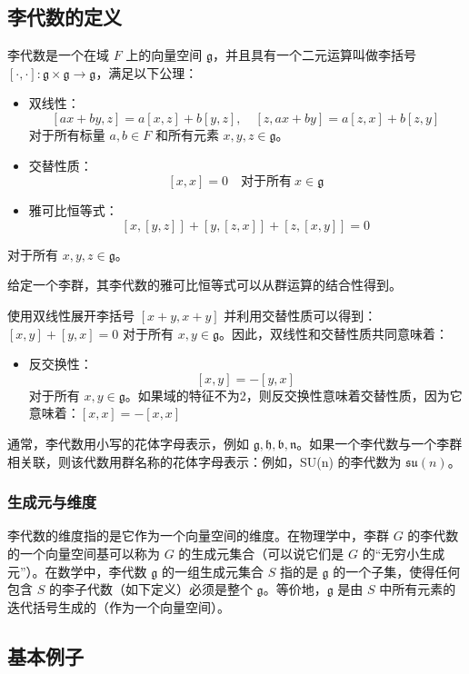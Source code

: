 \subsection{李代数的定义}  
李代数是一个在域 \( F \) 上的向量空间 \( \mathfrak{g} \)，并且具有一个二元运算叫做李括号 \( [\cdot, \cdot]: \mathfrak{g} \times \mathfrak{g} \to \mathfrak{g} \)，满足以下公理：

\begin{itemize}
\item 双线性：  
   \[
   [ax + by, z] = a[x, z] + b[y, z], \quad [z, ax + by] = a[z, x] + b[z, y]~
   \]
   对于所有标量 \( a, b \in F \) 和所有元素 \( x, y, z \in \mathfrak{g} \)。
\item 交替性质：
   \[
   [x, x] = 0 \quad \text{对于所有} \ x \in \mathfrak{g}~
   \]
\item 雅可比恒等式：
   \[
   [x, [y, z]] + [y, [z, x]] + [z, [x, y]] = 0~
   \]
\end{itemize}
   对于所有 \( x, y, z \in \mathfrak{g} \)。

   给定一个李群，其李代数的雅可比恒等式可以从群运算的结合性得到。

使用双线性展开李括号 \( [x + y, x + y] \) 并利用交替性质可以得到：\([x, y] + [y, x] = 0\)
对于所有 \( x, y \in \mathfrak{g} \)。因此，双线性和交替性质共同意味着：
\begin{itemize}
\item 反交换性：
   \[
   [x, y] = -[y, x]~
   \]
对于所有 \( x, y \in \mathfrak{g} \)。如果域的特征不为2，则反交换性意味着交替性质，因为它意味着：\([x, x] = -[x, x]\)
\end{itemize}
   
通常，李代数用小写的花体字母表示，例如 \( \mathfrak{g}, \mathfrak{h}, \mathfrak{b}, \mathfrak{n} \)。如果一个李代数与一个李群相关联，则该代数用群名称的花体字母表示：例如，SU(n) 的李代数为 \( \mathfrak{su}(n) \)。
\subsubsection{生成元与维度}  
李代数的维度指的是它作为一个向量空间的维度。在物理学中，李群 \( G \) 的李代数的一个向量空间基可以称为 \( G \) 的生成元集合（可以说它们是 \( G \) 的“无穷小生成元”）。在数学中，李代数 \( \mathfrak{g} \) 的一组生成元集合 \( S \) 指的是 \( \mathfrak{g} \) 的一个子集，使得任何包含 \( S \) 的李子代数（如下定义）必须是整个 \( \mathfrak{g} \)。等价地，\( \mathfrak{g} \) 是由 \( S \) 中所有元素的迭代括号生成的（作为一个向量空间）。
\subsection{基本例子}  

